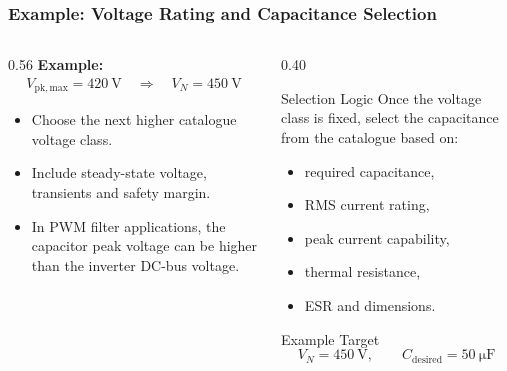 \begin{frame}
\frametitle{Example: Voltage Rating and Capacitance Selection}

\begin{columns}
\begin{column}{0.56\textwidth}
\textbf{Example:}
\begin{align}
    V_{\mathrm{pk,max}} = 420~\si{\volt}
    \quad \Rightarrow \quad
    V_N = 450~\si{\volt}
\end{align}
\begin{itemize}
    \item Choose the next higher catalogue voltage class.
    \item Include steady-state voltage, transients and safety margin.
    \item In PWM filter applications, the capacitor peak voltage can be higher than the inverter DC-bus voltage.
\end{itemize}
\end{column}

\begin{column}{0.40\textwidth}
\begin{block}{Selection Logic}
Once the voltage class is fixed, select the capacitance from the catalogue based on:
\begin{itemize}
    \item required capacitance,
    \item RMS current rating,
    \item peak current capability,
    \item thermal resistance,
    \item ESR and dimensions.
\end{itemize}
\end{block}

\begin{block}{Example Target}
\small
\[
V_N = 450~\si{\volt}, 
\qquad
C_{\mathrm{desired}} = 50~\si{\micro\farad}
\]
\end{block}
\end{column}
\end{columns}

\end{frame}


